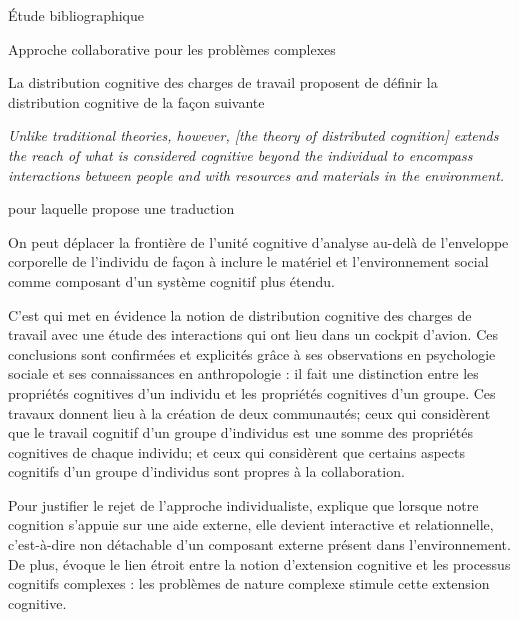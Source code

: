 \documentclass[myfrancais,ngerman,english,frenchb]{mythesis}
\begin{document}
\begin{mychapter}{Étude bibliographique}
\begin{mysection}{Approche collaborative pour les problèmes complexes}
\begin{mysubsection}{La distribution cognitive des charges de travail}
				 proposent de définir la distribution cognitive de la façon suivante
				\begin{myquote}[english]
					\it Unlike traditional theories, however, [the theory of distributed cognition] extends the reach of what is considered cognitive beyond the individual to encompass interactions between people and with resources and materials in the environment.
				\end{myquote}
				pour laquelle  propose une traduction
				\begin{myquote}[frenchb]
					On peut déplacer la frontière de l'unité cognitive d'analyse au-delà de l'enveloppe corporelle de l'individu de façon à inclure le matériel et l'environnement social comme composant d'un système cognitif plus étendu.
				\end{myquote}

				C'est  qui met en évidence la notion de distribution cognitive des charges de travail avec une étude des interactions qui ont lieu dans un cockpit d'avion.
				Ces conclusions sont confirmées et explicités grâce à ses observations en psychologie sociale et ses connaissances en anthropologie  : il fait une distinction entre les propriétés cognitives d'un individu et les propriétés cognitives d'un groupe.
				Ces travaux donnent lieu à la création de deux communautés; ceux qui considèrent que le travail cognitif d'un groupe d'individus est une somme des propriétés cognitives de chaque individu; et ceux qui considèrent que certains aspects cognitifs d'un groupe d'individus sont propres à la collaboration.

				Pour justifier le rejet de l'approche individualiste,  explique que lorsque notre cognition s'appuie sur une aide externe, elle devient interactive et relationnelle, c'est-à-dire non détachable d'un composant externe présent dans l'environnement.
				De plus,  évoque le lien étroit entre la notion d'extension cognitive et les processus cognitifs complexes : les problèmes de nature complexe stimule cette extension cognitive.


\end{mysubsection}
\end{mysection}
\end{mychapter}
\end{document}
